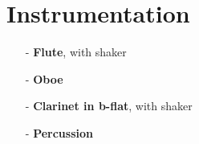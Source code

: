 \section{Instrumentation}

\begin{itemize}

    \item[-] \textbf{Flute}, with shaker \\

    \item[-] \textbf{Oboe} \\

    \item[-] \textbf{Clarinet in b-flat}, with shaker \\

    \item[-] \textbf{Percussion} \\


\end{itemize}
